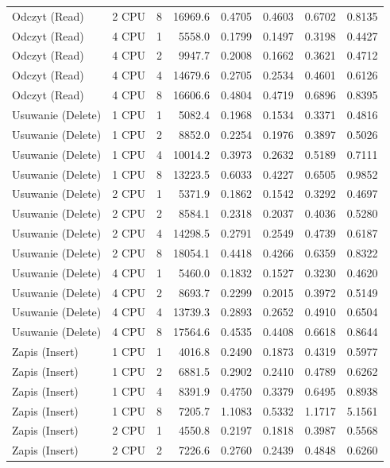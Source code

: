 \begin{table}[ht]
{\begin{tabular}{llcrrrrr}
Odczyt (Read) & 2 CPU & 8 & 16969.6 & 0.4705 & 0.4603 & 0.6702 & 0.8135 \\
Odczyt (Read) & 4 CPU & 1 & 5558.0 & 0.1799 & 0.1497 & 0.3198 & 0.4427 \\
Odczyt (Read) & 4 CPU & 2 & 9947.7 & 0.2008 & 0.1662 & 0.3621 & 0.4712 \\
Odczyt (Read) & 4 CPU & 4 & 14679.6 & 0.2705 & 0.2534 & 0.4601 & 0.6126 \\
Odczyt (Read) & 4 CPU & 8 & 16606.6 & 0.4804 & 0.4719 & 0.6896 & 0.8395 \\
Usuwanie (Delete) & 1 CPU & 1 & 5082.4 & 0.1968 & 0.1534 & 0.3371 & 0.4816 \\
Usuwanie (Delete) & 1 CPU & 2 & 8852.0 & 0.2254 & 0.1976 & 0.3897 & 0.5026 \\
Usuwanie (Delete) & 1 CPU & 4 & 10014.2 & 0.3973 & 0.2632 & 0.5189 & 0.7111 \\
Usuwanie (Delete) & 1 CPU & 8 & 13223.5 & 0.6033 & 0.4227 & 0.6505 & 0.9852 \\
Usuwanie (Delete) & 2 CPU & 1 & 5371.9 & 0.1862 & 0.1542 & 0.3292 & 0.4697 \\
Usuwanie (Delete) & 2 CPU & 2 & 8584.1 & 0.2318 & 0.2037 & 0.4036 & 0.5280 \\
Usuwanie (Delete) & 2 CPU & 4 & 14298.5 & 0.2791 & 0.2549 & 0.4739 & 0.6187 \\
Usuwanie (Delete) & 2 CPU & 8 & 18054.1 & 0.4418 & 0.4266 & 0.6359 & 0.8322 \\
Usuwanie (Delete) & 4 CPU & 1 & 5460.0 & 0.1832 & 0.1527 & 0.3230 & 0.4620 \\
Usuwanie (Delete) & 4 CPU & 2 & 8693.7 & 0.2299 & 0.2015 & 0.3972 & 0.5149 \\
Usuwanie (Delete) & 4 CPU & 4 & 13739.3 & 0.2893 & 0.2652 & 0.4910 & 0.6504 \\
Usuwanie (Delete) & 4 CPU & 8 & 17564.6 & 0.4535 & 0.4408 & 0.6618 & 0.8644 \\
Zapis (Insert) & 1 CPU & 1 & 4016.8 & 0.2490 & 0.1873 & 0.4319 & 0.5977 \\
Zapis (Insert) & 1 CPU & 2 & 6881.5 & 0.2902 & 0.2410 & 0.4789 & 0.6262 \\
Zapis (Insert) & 1 CPU & 4 & 8391.9 & 0.4750 & 0.3379 & 0.6495 & 0.8938 \\
Zapis (Insert) & 1 CPU & 8 & 7205.7 & 1.1083 & 0.5332 & 1.1717 & 5.1561 \\
Zapis (Insert) & 2 CPU & 1 & 4550.8 & 0.2197 & 0.1818 & 0.3987 & 0.5568 \\
Zapis (Insert) & 2 CPU & 2 & 7226.6 & 0.2760 & 0.2439 & 0.4848 & 0.6260 \\

\end{tabular}}
\end{table}
